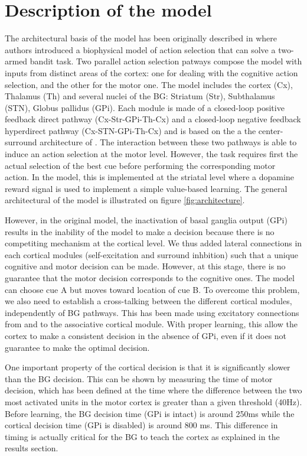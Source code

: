 \section{Description of the model}

The architectural basis of the model has been originally described in
\citet{Guthrie2013} where authors introduced a biophysical model of action
selection that can solve a two-armed bandit task. Two parallel action selection
patways compose the model with inputs from distinct areas of the cortex: one
for dealing with the cognitive action selection, and the other for the motor
one. The model includes the cortex (Cx), Thalamus (Th) and several nuclei of
the BG: Striatum (Str), Subthalamus (STN), Globus pallidus (GPi). Each module
is made of a closed-loop positive feedback direct pathway (Cx-Str-GPi-Th-Cx)
and a closed-loop negative feedback hyperdirect pathway (Cx-STN-GPi-Th-Cx) and
is based on the a the center-surround architecture of \cite{Mink:1996}. The
interaction between these two pathways is able to induce an action selection at
the motor level. However, the task requires first the actual selection of the
best cue before performing the corresponding motor action. In the
\citet{Guthrie2013} model, this is implemented at the striatal level where a
dopamine reward signal is used to implement a simple value-based learning. The
general architectural of the model is illustrated on figure \ref{fig:architecture}.

However, in the original model, the inactivation of basal ganglia output (GPi)
results in the inability of the model to make a decision because there is no
competiting mechanism at the cortical level. We thus added lateral connections
in each cortical modules (self-excitation and surround inhbition) such that a
unique cognitive and motor decision can be made. However, at this stage, there
is no guarantee that the motor decision corresponds to the cognitive ones. The
model can choose cue A but moves toward location of cue B. To overcome this
problem, we also need to establish a cross-talking between the different
cortical modules, independently of BG pathways. This has been made using
excitatory connections from and to the associative cortical module. With proper
learning, this allow the cortex to make a consistent decision in the absence of
GPi, even if it does not guarantee to make the optimal decision.

One important property of the cortical decision is that it is significantly
slower than the BG decision. This can be shown by measuring the time of motor
decision, which has been defined at the time where the difference between the
two most activated units in the motor cortex is greater than a given threshold
(40Hz). Before learning, the BG decision time (GPi is intact) is around 250ms
while the cortical decision time (GPi is disabled) is around 800 ms. This
difference in timing is actually critical for the BG to teach the cortex as
explained in the results section.